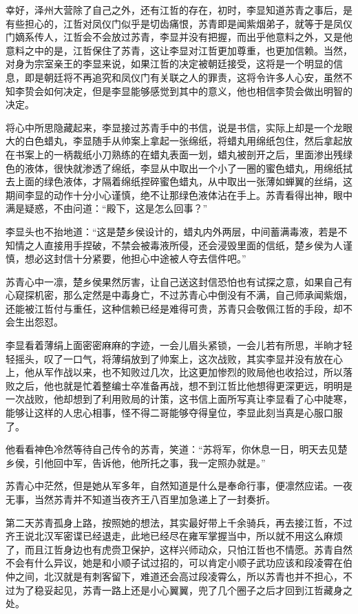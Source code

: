 幸好，泽州大营除了自己之外，还有江哲的存在，初时，李显知道苏青之事后，是有些担心的，江哲对凤仪门似乎是切齿痛恨，苏青即是闻紫烟弟子，就等于是凤仪门嫡系传人，江哲会不会放过苏青，李显并没有把握，而出乎他意料之外，又是他意料之中的是，江哲保住了苏青，这让李显对江哲更加尊重，也更加信赖。当然，对身为宗室亲王的李显来说，如果江哲的决定被朝廷接受，这将是一个明显的信息，即是朝廷将不再追究和凤仪门有关联之人的罪责，这将令许多人心安，虽然不知李贽会如何决定，但是李显能够感觉到其中的意义，他也相信李贽会做出明智的决定。

将心中所思隐藏起来，李显接过苏青手中的书信，说是书信，实际上却是一个龙眼大的白色蜡丸，李显随手从帅案上拿起一张绵纸，将蜡丸用绵纸包住，然后拿起放在书案上的一柄裁纸小刀熟练的在蜡丸表面一划，蜡丸被剖开之后，里面渗出残绿色的液体，很快就渗透了绵纸，李显从中取出一个小了一圈的蜜色蜡丸，用绵纸拭去上面的绿色液体，才隔着绵纸捏碎蜜色蜡丸，从中取出一张薄如蝉翼的丝绢，这期间李显的动作十分小心谨慎，绝不让那绿色液体沾在手上。苏青看得出神，眼中满是疑惑，不由问道：“殿下，这是怎么回事？”

李显头也不抬地道：“这是楚乡侯设计的，蜡丸内外两层，中间蓄满毒液，若是不知情之人直接用手捏破，不禁会被毒液所侵，还会浸毁里面的信纸，楚乡侯为人谨慎，想必这封信十分紧要，他担心中途被人夺去信件吧。”

苏青心中一凛，楚乡侯果然厉害，让自己送这封信恐怕也有试探之意，如果自己有心窥探机密，那么定然是中毒身亡，不过苏青心中倒没有不满，自己师承闻紫烟，还能被江哲付与重任，这种信赖已经是难得可贵，苏青只会敬佩江哲的手段，却不会生出怨怼。

李显看着薄绢上面密密麻麻的字迹，一会儿眉头紧锁，一会儿若有所思，半晌才轻轻摇头，叹了一口气，将薄绢放到了帅案上，这次战败，其实李显并没有放在心上，他从军作战以来，也不知败过几次，比这更加惨烈的败局他也收拾过，所以落败之后，他也就是忙着整编士卒准备再战，想不到江哲比他想得更深更远，明明是一次战败，他却想到了利用败局的计策，这书信上面所写真让李显看了心中陡寒，能够让这样的人忠心相事，怪不得二哥能够夺得皇位，李显此刻当真是心服口服了。

他看看神色冷然等待自己传令的苏青，笑道：“苏将军，你休息一日，明天去见楚乡侯，引他回中军，告诉他，他所托之事，我一定照办就是。”

苏青心中茫然，但是她从军多年，自然知道是什么是奉命行事，便凛然应诺。一夜无事，当然苏青并不知道当夜齐王八百里加急递上了一封奏折。

第二天苏青孤身上路，按照她的想法，其实最好带上千余骑兵，再去接江哲，不过齐王说北汉军密谍已经退走，此地已经尽在雍军掌握当中，所以就不用这么麻烦了，而且江哲身边也有虎赍卫保护，这样兴师动众，只怕江哲也不情愿。苏青自然不会有什么异议，她是和小顺子试过招的，可以肯定小顺子武功应该和段凌霄在伯仲之间，北汉就是有刺客留下，难道还会高过段凌霄么，所以苏青也并不担心，不过为了稳妥起见，苏青一路上还是小心翼翼，兜了几个圈子之后才回到江哲藏身之处。

